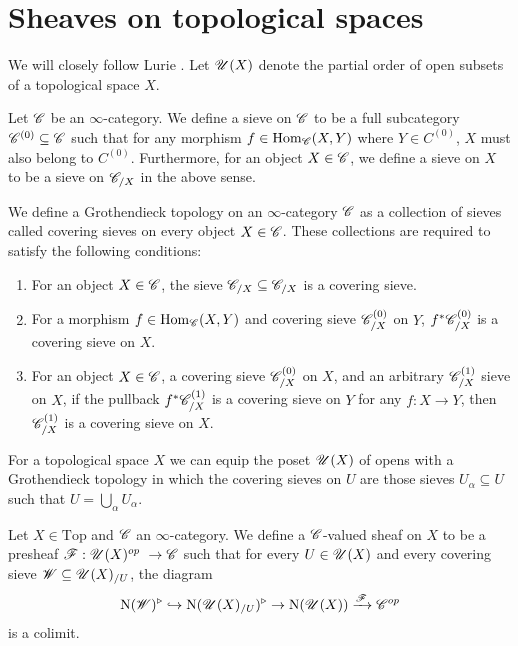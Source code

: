 \documentclass[../../thesis.tex]{subfiles}
\begin{document}
\section{Sheaves on topological spaces}
We will closely follow Lurie \cite{HTT}.
Let $\mathscr{U}(X)$ denote the partial order of open subsets of a topological space $X$.
\begin{definition}
    Let $\mathscr{C}$ be an $\infty$-category.
    We define a sieve on $\mathscr{C}$ to be a full subcategory $\mathscr{C}^{(0)} \subseteq \mathscr{C}$ such that for any morphism $f \in \mathrm{Hom}_{\mathscr{C}}(X,Y)$ where $Y\in C^{(0)}$, $X$ must also belong to $C^{(0)}$.
    Furthermore, for an object $X \in \mathscr{C}$, we define a sieve on $X$ to be a sieve on $\mathscr{C}_{/X}$ in the above sense.
\end{definition}
\begin{definition}
    We define a Grothendieck topology on an $\infty$-category $\mathscr{C}$ as a collection of sieves called covering sieves on every object $X\in \mathscr{C}$.
    These collections are required to satisfy the following conditions:
    \begin{enumerate}
        \item For an object $X\in \mathscr{C}$, the sieve $\mathscr{C}_{/X} \subseteq \mathscr{C}_{/X}$ is a covering sieve.
        \item For a morphism $f \in \mathrm{Hom}_{\mathscr{C}}(X,Y)$ and covering sieve $\mathscr{C}^{(0)}_{/X}$ on $Y$, $f^*\mathscr{C}^{(0)}_{/X}$ is a covering sieve on $X$.
        \item For an object $X \in \mathscr{C}$, a covering sieve $\mathscr{C}^{(0)}_{/X}$ on $X$, and an arbitrary  $\mathscr{C}^{(1)}_{/X}$ sieve on $X$, if the pullback $f^*\mathscr{C}^{(1)}_{/X}$ is a covering sieve on $Y$ for any $f: X \to Y$, then $\mathscr{C}^{(1)}_{/X}$ is a covering sieve on $X$.
    \end{enumerate}
\end{definition}
For a topological space $X$ we can equip the poset $\mathscr{U}(X)$ of opens with a Grothendieck topology in which the covering sieves on $U$ are those sieves $U_{\alpha} \subseteq U$ such that $U = \bigcup_{\alpha}U_{\alpha}$.
\begin{definition}\label{sheaf_on_top}
    Let $X \in \mathrm{Top}$ and $\mathscr{C}$ an $\infty$-category.
    We define a $\mathscr{C}$-valued sheaf on $X$ to be a presheaf $\F: \Open(X)^{op} \to \C$ such that for every $U\in \mathscr{U}(X)$ and every covering sieve $\mathscr{W} \subseteq \mathscr{U}(X)_{/U}$, the diagram
    \[
        \mathrm{N}(\mathscr{W})^{\triangleright} \hookrightarrow \mathrm{N}(\mathscr{U}(X)_{/U})^{\triangleright} \rightarrow \mathrm{N}(\mathscr{U}(X))\xrightarrow{\mathscr{F}}\mathscr{C}^{op}
    \]
    is a colimit.
\end{definition}
\end{document}
